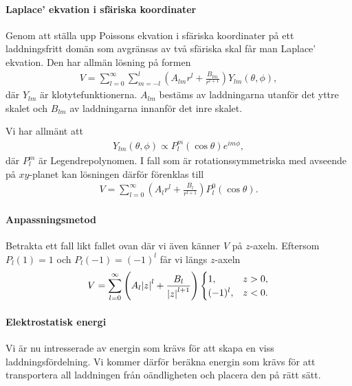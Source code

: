 \paragraph{Laplace' ekvation i sfäriska koordinater}
Genom att ställa upp Poissons ekvation i sfäriska koordinater på ett laddningsfritt domän som avgränsas av två sfäriska skal får man Laplace' ekvation. Den har allmän lösning på formen
\begin{align*}
	V = \sum\limits_{l = 0}^{\infty}\sum\limits_{m = -l}^{l}\left(A_{lm}r^{l} + \frac{B_{lm}}{r^{l + 1}}\right)Y_{lm}(\theta, \phi),
\end{align*}
där $Y_{lm}$ är klotytefunktionerna. $A_{lm}$ bestäms av laddningarna utanför det yttre skalet och $B_{lm}$ av laddningarna innanför det inre skalet.

Vi har allmänt att
\begin{align*}
	Y_{lm}(\theta, \phi)\propto P_{l}^{m}(\cos{\theta})e^{im\phi},
\end{align*}
där $P_{l}^{m}$ är Legendrepolynomen. I fall som är rotationssymmetriska med avseende på $xy$-planet kan lösningen därför förenklas till
\begin{align*}
	V = \sum\limits_{l = 0}^{\infty}\left(A_{l}r^{l} + \frac{B_{l}}{r^{l + 1}}\right)P_{l}^{0}(\cos{\theta}).
\end{align*}

\paragraph{Anpassningsmetod}
Betrakta ett fall likt fallet ovan där vi även känner $V$ på $z$-axeln. Eftersom $P_{l}(1) = 1$ och $P_{l}(-1) = (-1)^{l}$ får vi längs $z$-axeln
\begin{align*}
	V = \sum\limits_{l = 0}^{\infty}\left(A_{l}\abs{z}^{l} + \frac{B_{l}}{\abs{z}^{l + 1}}\right)
	\begin{cases}
		1,        &z > 0, \\
		(-1)^{l}, &z < 0.
	\end{cases}
\end{align*}

\paragraph{Elektrostatisk energi}
Vi är nu intresserade av energin som krävs för att skapa en viss laddningsfördelning. Vi kommer därför beräkna energin som krävs för att transportera all laddningen från oändligheten och placera den på rätt sätt.

